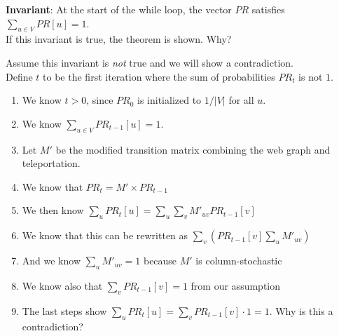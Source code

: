 \documentclass[11pt]{exam}
\begin{document}
	\textbf{Invariant}: At the start of the while loop, the vector $PR$ satisfies $\sum_{u \in V} PR[u] = 1$. \\
	
	If this invariant is true, the theorem is shown. Why?
	\newpage
	
	Assume this invariant is \emph{not} true and we will show a contradiction. \\
	
	Define $t$ to be the first iteration where the sum of probabilities $PR_t$ is not $1$.
	
	\begin{enumerate}
		\item We know $t > 0$, since $PR_0$ is initialized to $1/|V|$ for all $u$. \\
		\item We know $\sum_{u \in V} PR_{t-1}[u] = 1$. \\
		\item Let $M'$ be the modified transition matrix combining the web graph and teleportation. \\ 
		\vs{4cm} 
		\item We know that $PR_t = M' \times PR_{t-1}$\\
		\item We then know $\sum_u PR_t[u] = \sum_u \sum_v M'_{uv} PR_{t-1}[v]$ \\
		\item We know that this can be rewritten as $\sum_v \left( PR_{t-1}[v] \sum_u M'_{uv} \right)$ \\
		
		\item And we know $\sum_u M'_{uv} = 1$ because $M'$ is column-stochastic \\
		\item We know also that $\sum_v PR_{t-1}[v] = 1$ from our assumption \\
		\item The last steps show $\sum_u PR_t[u] = \sum_v PR_{t-1}[v] \cdot 1 = 1$. Why is this a contradiction?
	\end{enumerate}
	
	\newpage
	
	
\end{document}
